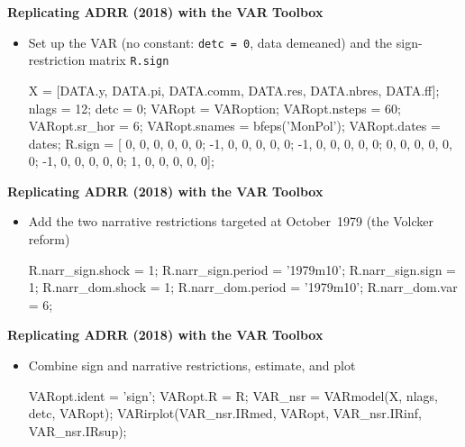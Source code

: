 \documentclass[10pt,handout]{beamer}
\begin{document}
\begin{frame}[fragile]
{\textbf{Replicating ADRR (2018) with the VAR Toolbox}}
\begin{itemize}
\item Set up the VAR (no constant: \texttt{detc = 0}, data demeaned) and the sign-restriction matrix \texttt{R.sign}
\par\smallskip
\begin{matlabcode}
X = [DATA.y, DATA.pi, DATA.comm, DATA.res, DATA.nbres, DATA.ff];
nlags = 12;  detc = 0;
VARopt = VARoption;
VARopt.nsteps = 60;
VARopt.sr_hor = 6;
VARopt.snames = {bfeps('MonPol')};
VARopt.dates  = dates;
R.sign = [ 0, 0, 0, 0, 0, 0;
          -1, 0, 0, 0, 0, 0;
          -1, 0, 0, 0, 0, 0;
           0, 0, 0, 0, 0, 0;
          -1, 0, 0, 0, 0, 0;
           1, 0, 0, 0, 0, 0];
\end{matlabcode}
\end{itemize}
\end{frame}


\begin{frame}[fragile]
{\textbf{Replicating ADRR (2018) with the VAR Toolbox}}
\begin{itemize}
\item Add the two narrative restrictions targeted at October~1979 (the Volcker reform)
\par\smallskip
\begin{matlabcode}
R.narr_sign.shock  = 1;
R.narr_sign.period = '1979m10';
R.narr_sign.sign   = 1;
R.narr_dom.shock  = 1;
R.narr_dom.period = '1979m10';
R.narr_dom.var    = 6;
\end{matlabcode}
\end{itemize}
\end{frame}


\begin{frame}[fragile]
{\textbf{Replicating ADRR (2018) with the VAR Toolbox}}
\begin{itemize}
\item Combine sign and narrative restrictions, estimate, and plot
\par\smallskip
\begin{matlabcode}
VARopt.ident = 'sign';
VARopt.R = R;
VAR_nsr = VARmodel(X, nlags, detc, VARopt);
VARirplot(VAR_nsr.IRmed, VARopt, VAR_nsr.IRinf, VAR_nsr.IRsup);
\end{matlabcode}
\end{itemize}
\end{frame}
\end{document}
